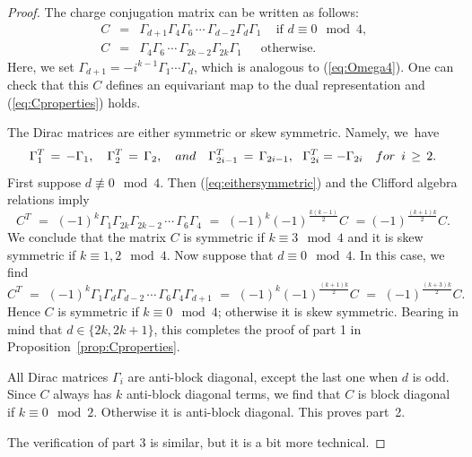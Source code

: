 \documentclass[english]{ourlematema}
\numberwithin{theorem}{section}
\theoremstyle{definition}
\begin{document}
\begin{proof}
    The charge conjugation matrix can be written as follows:
\begin{equation}
\label{eq:CCM}
\begin{matrix}
    C & = & \Gamma_{d + 1} \Gamma_4 \Gamma_6 \,\cdots\,
    \Gamma_{d-2} \Gamma_{d} \Gamma_1 \,\,\,\,\, \text{ if $d \equiv 0\! \!\!\!\mod{4}$,}
    \\
    C & = & \!\!\!\!\!\! \Gamma_4  \Gamma_6 \,\cdots\, \Gamma_{2k-2} \Gamma_{2k} \Gamma_1 \,
    \quad \text{ otherwise.}
    \end{matrix}
\end{equation}
    Here, we set $\Gamma_{d + 1} = -i^{k - 1} \Gamma_1 \cdots \Gamma_d$,
    which is analogous to (\ref{eq:Omega4}).    
    One can check that this $C$ defines an equivariant map to the dual representation and 
    (\ref{eq:Cproperties}) holds.
    
The Dirac matrices are either symmetric or skew symmetric. Namely, we~have
\begin{equation}
\label{eq:eithersymmetric}
    \Gamma_1^T\,=\, -\Gamma_1, \quad \Gamma_2^T\, =\,\Gamma_2,  \quad {\rm and} \quad
     \Gamma_{2i - 1}^T \,= \, \Gamma_{2i - 1},\,\,\,\,
     \Gamma_{2i}^T = -\Gamma_{2i} \quad  {\rm for} \,\,\, i \,\geq \,2 .
\end{equation}
First suppose 
  $d \not\equiv 0 \!\! \mod{4}$. Then (\ref{eq:eithersymmetric}) and the Clifford algebra relations imply
        $$
    C^T \,\,=\,\, (-1)^k \Gamma_1 \Gamma_{2k} \Gamma_{2k-2}\, \cdots\,\Gamma_6 \Gamma_4 
    \,\,=\,\, (-1)^k(-1)^{\frac{k(k - 1)}{2}} C \,\,= (-1)^{\frac{(k + 1)k}{2}} C.
    $$
    We conclude that the matrix  $C$ is symmetric if $k \equiv 3 \!\! \mod{4}$
    and it is skew symmetric if $k \equiv 1,2 \!\! \mod{4}$.
          Now suppose that $d \equiv 0 \!\! \mod{4}$. In this case, we find
    $$
    C^T\,\, =\,\, (-1)^k \Gamma_1 \Gamma_{d} \Gamma_{d-2}\, \cdots\, \Gamma_6 \Gamma_4 \Gamma_{d + 1} \,\,
    = \,\,(-1)^k (-1)^{\frac{(k + 1)k}{2}} C \,\,=\,\, (-1)^{\frac{(k + 3)k}{2}} C.
    $$
    Hence $C$ is symmetric if $k \equiv 0 \!\! \!\mod{4}$; otherwise it is skew symmetric. 
    Bearing in mind that $d \in \{2k,2k+1\}$, this completes
    the proof of part 1 in Proposition~\ref{prop:Cproperties}.
    
    All  Dirac matrices $\Gamma_i$ are anti-block diagonal, except the last one when $d$ is odd. Since $C$ always has $k$ anti-block diagonal terms, we find that $C$ is block diagonal if $k \equiv 0 \!\! \mod{2}$. Otherwise it is 
    anti-block diagonal. This proves part~2.

The verification of  part 3 is similar, but it is a bit more technical.
\end{proof}
\end{document}
